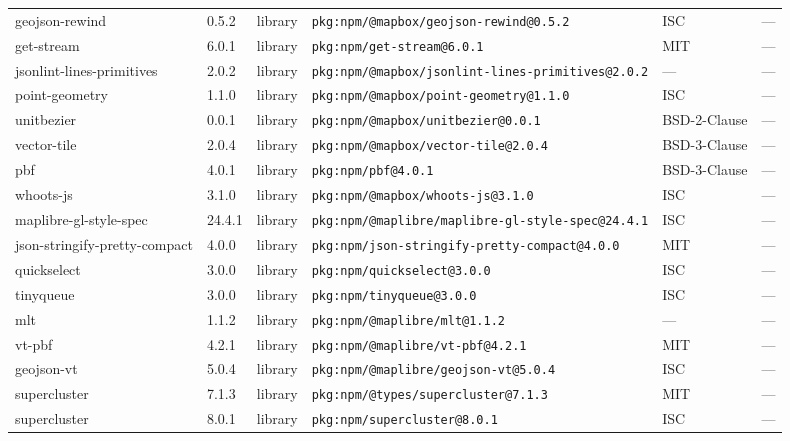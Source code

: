 \documentclass[11pt,a4paper]{article}
\begin{document}
\begin{longtable}{|p{4cm}|p{2cm}|p{1.6cm}|p{5cm}|p{1.5cm}|p{3.5cm}|}
\raggedright geojson-rewind & 0.5.2 & library & \small\texttt{pkg:npm/@mapbox/geojson-rewind@0.5.2} & ISC & \small — \\
\raggedright get-stream & 6.0.1 & library & \small\texttt{pkg:npm/get-stream@6.0.1} & MIT & \small — \\
\raggedright jsonlint-lines-primitives & 2.0.2 & library & \small\texttt{pkg:npm/@mapbox/jsonlint-lines-primitives@2.0.2} & — & \small — \\
\raggedright point-geometry & 1.1.0 & library & \small\texttt{pkg:npm/@mapbox/point-geometry@1.1.0} & ISC & \small — \\
\raggedright unitbezier & 0.0.1 & library & \small\texttt{pkg:npm/@mapbox/unitbezier@0.0.1} & BSD-2-Clause & \small — \\
\raggedright vector-tile & 2.0.4 & library & \small\texttt{pkg:npm/@mapbox/vector-tile@2.0.4} & BSD-3-Clause & \small — \\
\raggedright pbf & 4.0.1 & library & \small\texttt{pkg:npm/pbf@4.0.1} & BSD-3-Clause & \small — \\
\raggedright whoots-js & 3.1.0 & library & \small\texttt{pkg:npm/@mapbox/whoots-js@3.1.0} & ISC & \small — \\
\raggedright maplibre-gl-style-spec & 24.4.1 & library & \small\texttt{pkg:npm/@maplibre/maplibre-gl-style-spec@24.4.1} & ISC & \small — \\
\raggedright json-stringify-pretty-compact & 4.0.0 & library & \small\texttt{pkg:npm/json-stringify-pretty-compact@4.0.0} & MIT & \small — \\
\raggedright quickselect & 3.0.0 & library & \small\texttt{pkg:npm/quickselect@3.0.0} & ISC & \small — \\
\raggedright tinyqueue & 3.0.0 & library & \small\texttt{pkg:npm/tinyqueue@3.0.0} & ISC & \small — \\
\raggedright mlt & 1.1.2 & library & \small\texttt{pkg:npm/@maplibre/mlt@1.1.2} & — & \small — \\
\raggedright vt-pbf & 4.2.1 & library & \small\texttt{pkg:npm/@maplibre/vt-pbf@4.2.1} & MIT & \small — \\
\raggedright geojson-vt & 5.0.4 & library & \small\texttt{pkg:npm/@maplibre/geojson-vt@5.0.4} & ISC & \small — \\
\raggedright supercluster & 7.1.3 & library & \small\texttt{pkg:npm/@types/supercluster@7.1.3} & MIT & \small — \\
\raggedright supercluster & 8.0.1 & library & \small\texttt{pkg:npm/supercluster@8.0.1} & ISC & \small — \\

\end{longtable}
\end{document}
